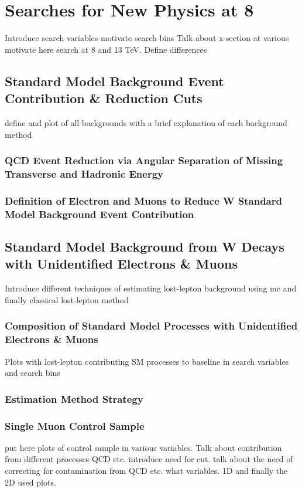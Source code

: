 \chapter{Searches for New Physics at 8 \tev}
\label{sec:SUSY_Search_Intro}
\todo Introduce search variables motivate search bins
\todo Talk about x-section at various \CM motivate here search at 8 and 13 TeV. Define differences

\section{Standard Model Background Event Contribution \& Reduction Cuts}
\label{sec:SM_BackGrounds}
\todo define and plot of all backgrounds with a brief explanation of each background method
\subsection{QCD Event Reduction via Angular Separation of Missing Transverse and Hadronic Energy}

\subsection{Definition of Electron and Muons to Reduce W Standard Model Background Event Contribution}
\label{sec:Lepton_Definition_Study}

\section{Standard Model Background from W Decays with Unidentified Electrons \& Muons}
\label{sec:Lost_Lepton_8TeV_Main}
\todo Introduce different techniques of estimating lost-lepton background using mc and finally classical lost-lepton method
\subsection{Composition of Standard Model Processes with Unidentified Electrons \& Muons}
\label{sec:Lost_Lepton_8TeV_Composition}
\todo Plots with lost-lepton contributing SM processes to baseline in search variables and search bins

\subsection{Estimation Method Strategy}
\label{sec:Lost_Lepton_8TeV_Method_Strategy}

\subsection{Single Muon Control Sample}
\label{sec:Lost_Lepton_8TeV_CS}
\todo put here plots of control sample in various variables. Talk about contribution from different processes QCD etc. introduce need for \mt cut.
talk about the need of correcting for contamination from QCD etc. what variables. 1D and finally the 2D used plots.
